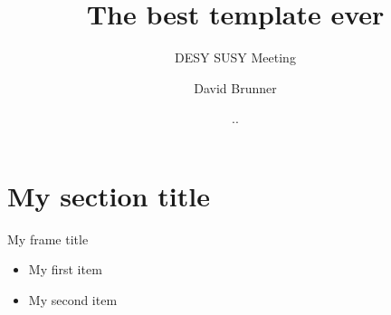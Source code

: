 \documentclass{beamer}
\title{The best template ever}
\subtitle{DESY SUSY Meeting}
\author[David Brunner]{David Brunner}
\institute[DESY]{Deutsches Elektronen-Synchrotron (DESY)}
\date{\the\day.\the\month.\the\year}
\begin{document}
{
    \begin{frame}
      \titlepage
    \end{frame}
}
\addtocounter{framenumber}{-1}


\section{My section title}

\begin{frame}{My frame title}
    \begin{itemize}
        \item My first item
        \item My second item
    \end{itemize}
\end{frame}
\end{document}
